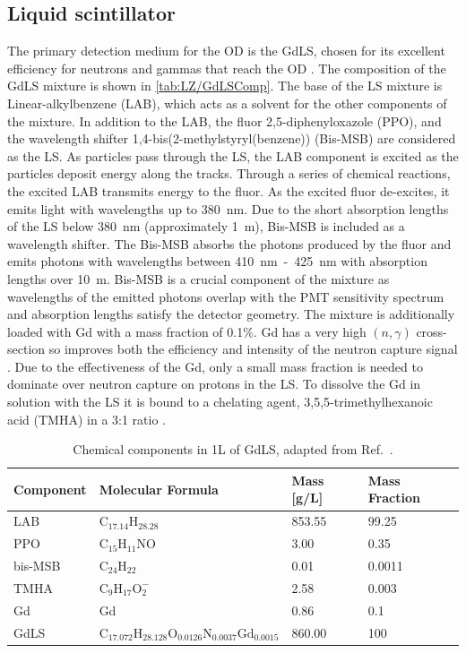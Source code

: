 \subsection{Liquid scintillator}\label{sec:LZ/LS}
The primary detection medium for the OD is the GdLS, chosen for its excellent efficiency for neutrons and gammas that reach the OD \cite{LZTDR}. The composition of the GdLS mixture is shown in \autoref{tab:LZ/GdLSComp}. The base of the LS mixture is Linear-alkylbenzene (LAB), which acts as a solvent for the other components of the mixture. In addition to the LAB, the fluor 2,5-diphenyloxazole (PPO), and the wavelength shifter 1,4-bis(2-methylstyryl(benzene)) (Bis-MSB) are considered as the LS. As particles pass through the LS, the LAB component is excited as the particles deposit energy along the tracks. Through a series of chemical reactions, the excited LAB transmits energy to the fluor. As the excited fluor de-excites, it emits light with wavelengths up to 380~nm. Due to the short absorption lengths of the LS below 380~nm (approximately 1~m), Bis-MSB is included as a wavelength shifter. The Bis-MSB absorbs the photons produced by the fluor and emits photons with wavelengths between 410~nm~-~425~nm with absorption lengths over 10~m. Bis-MSB is a crucial component of the mixture as wavelengths of the emitted photons overlap with the PMT sensitivity spectrum and absorption lengths satisfy the detector geometry.
The mixture is additionally loaded with Gd with a mass fraction of 0.1\%. Gd has a very high $(n,\gamma)$ cross-section so improves both the efficiency and intensity of the neutron capture signal \cite{LZTDR}. Due to the effectiveness of the Gd, only a small mass fraction is needed to dominate over neutron capture on protons in the LS. To dissolve the Gd in solution with the LS it is bound to a chelating agent, 3,5,5-trimethylhexanoic acid (TMHA) in a 3:1 ratio \cite{LZTDR,Haselschwardt:2018vmp}.
\begin{table}[!ht]
    \centering
    \caption{Chemical components in 1L of GdLS, adapted from Ref.~\cite{Haselschwardt:2018vmp}.}
    \begin{tabular}{llll}
        \hline\hline
        \textbf{Component} & \textbf{Molecular Formula} & \textbf{Mass [g/L]} & \textbf{Mass Fraction} \\
        \hline
        LAB & $\text{C}_{17.14}\text{H}_{28.28}$ & 853.55 & 99.25\\
        PPO & $\text{C}_{15}\text{H}_{11}\text{NO}$ & 3.00 & 0.35 \\
        bis-MSB & $\text{C}_{24}\text{H}_{22}$ & 0.01 & 0.0011\\
        TMHA & $\text{C}_{9}\text{H}_{17}\text{O}_{2}^{-}$ & 2.58 & 0.003\\
        Gd & Gd & 0.86 & 0.1 \\
        \hline
        GdLS & $\text{C}_{17.072} \text{H}_{28.128} \text{O}_{0.0126} \text{N}_{0.0037} \text{Gd}_{0.0015}$ & 860.00 & 100 \\
        \hline\hline
    \end{tabular}
    \label{tab:LZ/GdLSComp}
\end{table}
